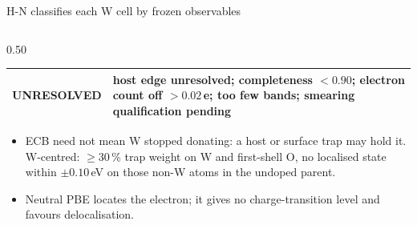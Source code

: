 \begin{frame}{H-N classifies each W cell by frozen observables}
\begin{columns}[T,onlytextwidth]
\begin{column}{0.50\textwidth}
\begin{tabularx}{\linewidth}{@{}l >{\raggedright\arraybackslash}X@{}}
        UNRESOLVED & host edge unresolved; completeness $< 0.90$; electron count off $> 0.02$\,e; too few
          bands; smearing qualification pending \\
        \bottomrule
      \end{tabularx}\par\endgroup
      \begin{itemize}
        \item ECB need not mean W stopped donating: a host or surface trap may hold it. W-centred: $\ge 30$\,\%
          trap weight on W and first-shell O, no localised state within $\pm0.10$\,eV on those non-W atoms in
          the undoped parent.
        \item Neutral PBE locates the electron; it gives no charge-transition level
          and favours delocalisation.
      \end{itemize}
    \end{column}
  \end{columns}
\end{frame}


